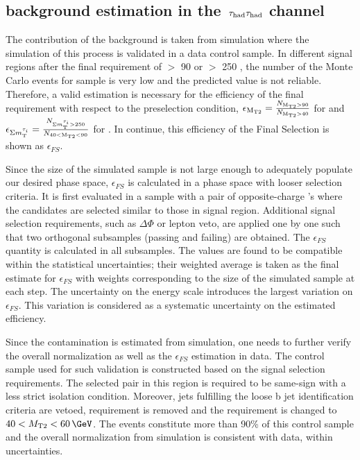 \subsection{\texorpdfstring{\wjets background estimation in the $\,\tau_{\rm had}\tau_{\rm had}$ channel}{Wjets background estimation in the tau-tau channel}}
\label{sect:bkgW}
The contribution of the \wjets background is taken from simulation where the simulation of this process is validated in a data control sample. 
In different signal regions after the final requirement of \mttwo $>$ 90 \GeV or \SumMT $>$ 250 \GeV, the number of the Monte Carlo events for \wjets sample is very low and the 
predicted value is not reliable. 
Therefore, a valid estimation is necessary for the efficiency of the final requirement with respect to the preselection condition, %
$\epsilon_{\rm M_{T2}}=\frac{N_{\rm M_{T2}>90}}{N_{\rm M_{T2}>40}}$ for  \binone and $\epsilon_{\Sigma m_{\rm T}^{\tau_i}}=\frac{N_{\Sigma m_{\rm T}^{\tau_i}>250}}{N_{40<\rm M_{T2}<90}}$ for \bintwo. In continue, this efficiency of the Final Selection is shown as $\epsilon_{FS}$.

Since the size of the simulated \wjets sample is not large enough to adequately populate our desired phase space, %
$\epsilon_{FS}$ is calculated in a phase space with looser selection criteria. It is first evaluated in a \wjets sample with a pair of opposite-charge \Tau's where the \Tau candidates are selected similar to those in signal region. 
Additional signal selection requirements, such as $\Delta \Phi$ or lepton veto, are applied one by one such that two orthogonal subsamples (passing and failing) are obtained. The $\epsilon_{FS}$ quantity is calculated in all subsamples. The values are found to be compatible within the statistical uncertainties; their weighted average is taken as the final estimate for $\epsilon_{FS}$ with weights corresponding to the size of the simulated sample at each step. The uncertainty on the \Tau energy scale introduces the largest variation on $\epsilon_{FS}$. This variation is considered as a systematic uncertainty on the estimated efficiency.

Since the \wjets contamination is estimated from simulation, one needs to further verify the overall normalization as well as the $\epsilon_{FS}$ estimation in data. The control sample used for such validation is constructed based on the \muTau signal selection requirements. The selected \muTau pair in this region is required to be same-sign with a less strict \Tau isolation condition. Moreover, jets fulfilling the loose b jet identification criteria are vetoed, \tauMT requirement is removed and the \mttwo requirement is changed to $40<\mttwo<60\,\GeV$. The \wjets events constitute more than 90\% of this control sample and the overall normalization from simulation is consistent with data, within uncertainties.

